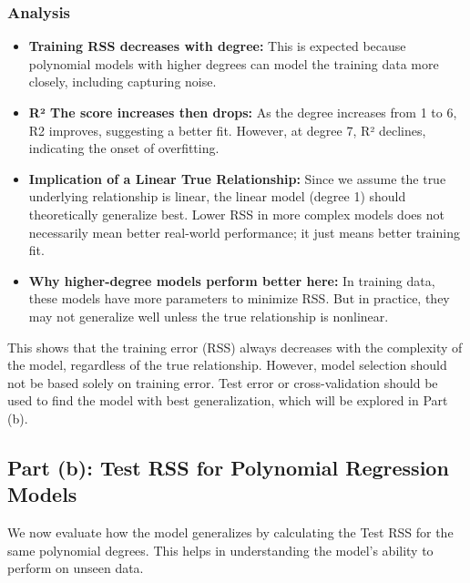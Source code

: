 \documentclass[12pt]{article}
\begin{document}
\subsubsection*{Analysis}
\begin{itemize}
    \item \textbf{Training RSS decreases with degree:} This is expected because polynomial models with higher degrees can model the training data more closely, including capturing noise.
    \item \textbf{R² The score increases then drops:} As the degree increases from 1 to 6, R2 improves, suggesting a better fit. However, at degree 7, R² declines, indicating the onset of overfitting.
    \item \textbf{Implication of a Linear True Relationship:} Since we assume the true underlying relationship is linear, the linear model (degree 1) should theoretically generalize best. Lower RSS in more complex models does not necessarily mean better real-world performance; it just means better training fit.
    \item \textbf{Why higher-degree models perform better here:} In training data, these models have more parameters to minimize RSS. But in practice, they may not generalize well unless the true relationship is nonlinear.
\end{itemize}

This shows that the training error (RSS) always decreases with the complexity of the model, regardless of the true relationship. However, model selection should not be based solely on training error. Test error or cross-validation should be used to find the model with best generalization, which will be explored in Part (b).


\subsection*{Part (b): Test RSS for Polynomial Regression Models}
We now evaluate how the model generalizes by calculating the Test RSS for the same polynomial degrees. This helps in understanding the model's ability to perform on unseen data.
\end{document}
